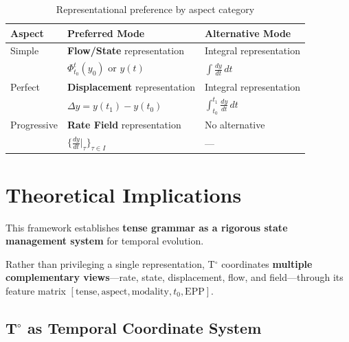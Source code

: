 \documentclass[11pt]{article}
\theoremstyle{defstyle}
\theoremstyle{mapstyle}
\newenvironment{keyinsight}
{\begin{tcolorbox}[
  enhanced,
  colback=keybox,
  colframe=headerblue,
  boxrule=1.2pt,
  arc=4pt,
  left=10pt,right=10pt,top=10pt,bottom=10pt,
  before skip=12pt,after skip=12pt
]}
{\end{tcolorbox}}
\begin{document}
\begin{table}[h]
\centering
\renewcommand{\arraystretch}{1.5}
\begin{tabular}{@{}>{\raggedright\arraybackslash}p{3cm}>{\raggedright\arraybackslash}p{4cm}>{\raggedright\arraybackslash}p{4cm}@{}}
\toprule
\textbf{Aspect} & \textbf{Preferred Mode} & \textbf{Alternative Mode} \\
\midrule
Simple & \textbf{Flow/State} representation & Integral representation \\
& $\Phi_{t_0}^t(y_0)$ or $y(t)$ & $\int \frac{dy}{dt}\,dt$ \\
\addlinespace
Perfect & \textbf{Displacement} representation & Integral representation \\
& $\Delta y = y(t_1) - y(t_0)$ & $\int_{t_0}^{t_1} \frac{dy}{dt}\,dt$ \\
\addlinespace
Progressive & \textbf{Rate Field} representation & No alternative \\
& $\{\frac{dy}{dt}|_\tau\}_{\tau \in I}$ & --- \\
\bottomrule
\end{tabular}
\caption{Representational preference by aspect category}
\end{table}

\vspace{2\baselineskip}

\section{Theoretical Implications}

\begin{keyinsight}
This framework establishes \textbf{tense grammar as a rigorous state management system} for temporal evolution.

Rather than privileging a single representation, T$^\circ$ coordinates \textbf{multiple complementary views}—rate, state, displacement, flow, and field—through its feature matrix $[\text{tense}, \text{aspect}, \text{modality}, t_0, \text{EPP}]$.
\end{keyinsight}

\subsection{T$^\circ$ as Temporal Coordinate System}
\end{document}
